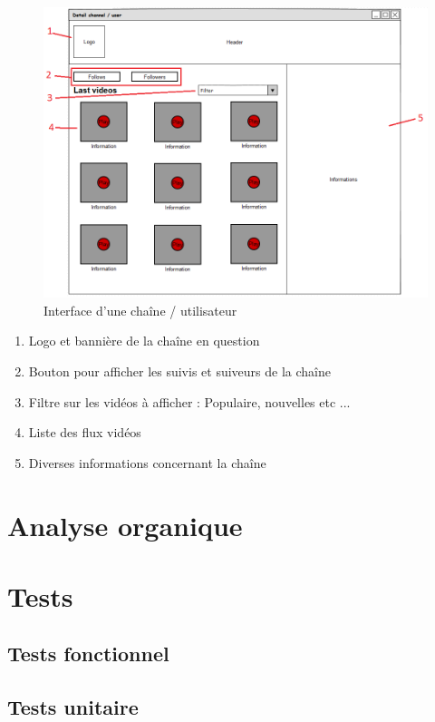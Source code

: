 \documentclass[11pt]{report} %
\begin{document}
		\begin{figure}[h]
			\center
			\includegraphics[width=1\textwidth]{../img/channelInterfacenum.png}
			\caption{Interface d'une chaîne / utilisateur}
			\label{interfacechannel}
		\end{figure}
		
		\begin{enumerate}
			\item Logo et bannière de la chaîne en question
			\item Bouton pour afficher les suivis et suiveurs de la chaîne
			\item Filtre sur les vidéos à afficher : Populaire, nouvelles etc ...
			\item Liste des flux vidéos
			\item Diverses informations concernant la chaîne
		\end{enumerate}
		
		
		
\chapter{Analyse organique}

\chapter{Tests}
	\section{Tests fonctionnel}
	\section{Tests unitaire}
\end{document}
